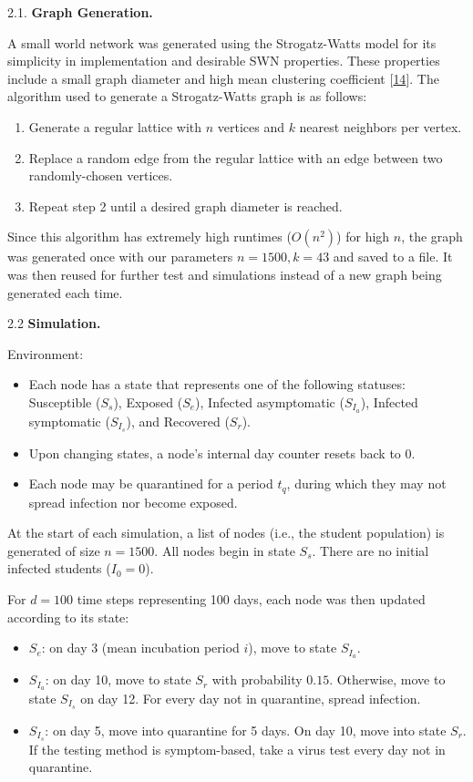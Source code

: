 \documentclass[fullpage]{extarticle}
\begin{document}
\begin{large}
\begin{flushleft}
2.1. \textbf{Graph Generation.}

A small world network was generated using the Strogatz-Watts model for its simplicity in implementation and desirable SWN properties. These properties include a small graph diameter and high mean clustering coefficient [\hyperref[ref:14]{14}].
\bigbreak
The algorithm used to generate a Strogatz-Watts graph is as follows:
\begin{enumerate}
	\item Generate a regular lattice with $n$ vertices and $k$ nearest neighbors per vertex.\\
	\item Replace a random edge from the regular lattice with an edge between two randomly-chosen vertices.
	\item Repeat step 2 until a desired graph diameter is reached.
\end{enumerate}

Since this algorithm has extremely high runtimes ($O(n^2)$) for high $n$, the graph was generated once with our parameters $n = 1500, k = 43$ and saved to a file. It was then reused for further test and simulations instead of a new graph being generated each time.\bigbreak

2.2 \textbf{Simulation.}

Environment:
\begin{itemize}
	\item Each node has a state that represents one of the following statuses: Susceptible ($S_s$), Exposed ($S_e$), Infected asymptomatic ($S_{I_a}$), Infected symptomatic ($S_{I_s}$), and Recovered ($S_r$).\\
	\item Upon changing states, a node's internal day counter resets back to 0.\\
	\item Each node may be quarantined for a period $t_q$, during which they may not spread infection nor become exposed.
\end{itemize}
\bigbreak
At the start of each simulation, a list of nodes (i.e., the student population) is generated of size $n = 1500$. All nodes begin in state $S_s$. There are no initial infected students ($I_0 = 0$).\bigbreak

For $d = 100$ time steps representing 100 days, each node was then updated according to its state:
\begin{itemize}
	\item $S_e$: on day $3$ (mean incubation period $i$), move to state $S_{I_a}$.\\
	\item $S_{I_a}$: on day 10, move to state $S_r$ with probability $0.15$. Otherwise, move to state $S_{I_s}$ on day 12. For every day not in quarantine, spread infection.\\
	\item $S_{I_s}$: on day 5, move into quarantine for 5 days. On day 10, move into state $S_r$. If the testing method is symptom-based, take a virus test every day not in quarantine.
\end{itemize}


\end{flushleft}
\end{large}
\end{document}
